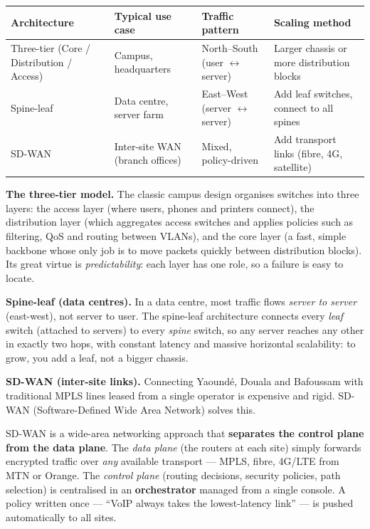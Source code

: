 \documentclass[11pt]{article}
\newcommand{\cle}[1]{{\popxbold\color{popdark}#1}}
\begin{document}
\begin{center}
\begin{tabularx}{\linewidth}{|l|X|X|X|}
\hline
\rowcolor{popblueL} \textbf{Architecture} & \textbf{Typical use case} & \textbf{Traffic pattern} & \textbf{Scaling method} \\
\hline
Three-tier (Core / Distribution / Access) & Campus, headquarters & North–South (user $\leftrightarrow$ server) & Larger chassis or more distribution blocks \\
\hline
Spine-leaf & Data centre, server farm & East–West (server $\leftrightarrow$ server) & Add leaf switches, connect to all spines \\
\hline
SD-WAN & Inter-site WAN (branch offices) & Mixed, policy-driven & Add transport links (fibre, 4G, satellite) \\
\hline
\end{tabularx}
\end{center}

\textbf{The three-tier model.} The classic campus design organises switches into three layers: the \cle{access layer} (where users, phones and printers connect), the \cle{distribution layer} (which aggregates access switches and applies policies such as filtering, QoS and routing between VLANs), and the \cle{core layer} (a fast, simple backbone whose only job is to move packets quickly between distribution blocks). Its great virtue is \emph{predictability}: each layer has one role, so a failure is easy to locate.

\textbf{Spine-leaf (data centres).} In a data centre, most traffic flows \emph{server to server} (east-west), not server to user. The \cle{spine-leaf} architecture connects every \emph{leaf} switch (attached to servers) to every \emph{spine} switch, so any server reaches any other in exactly two hops, with constant latency and massive horizontal scalability: to grow, you add a leaf, not a bigger chassis.

\textbf{SD-WAN (inter-site links).} Connecting Yaoundé, Douala and Bafoussam with traditional MPLS lines leased from a single operator is expensive and rigid. \cle{SD-WAN} (Software-Defined Wide Area Network) solves this.

\begin{definition}[SD-WAN]
SD-WAN is a wide-area networking approach that \textbf{separates the control plane from the data plane}. The \emph{data plane} (the routers at each site) simply forwards encrypted traffic over \emph{any} available transport — MPLS, fibre, 4G/LTE from MTN or Orange. The \emph{control plane} (routing decisions, security policies, path selection) is centralised in an \textbf{orchestrator} managed from a single console. A policy written once — ``VoIP always takes the lowest-latency link'' — is pushed automatically to all sites.
\end{definition}
\end{document}
